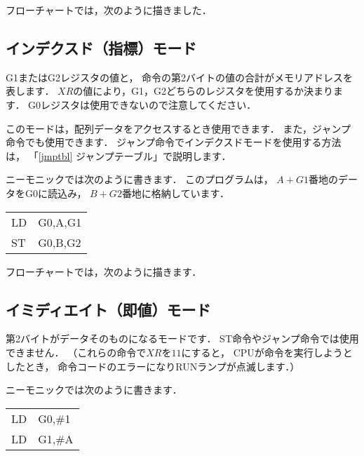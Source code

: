 フローチャートでは，次のように描きました．

\begin{center}
\end{center}

\subsection{インデクスド（指標）モード}
G1またはG2レジスタの値と，
命令の第2バイトの値の合計がメモリアドレスを表します．
$XR$の値により，G1，G2どちらのレジスタを使用するか決まります．
G0レジスタは使用できないので注意してください．

このモードは，配列データをアクセスするとき使用できます．
また，ジャンプ命令でも使用できます．
ジャンプ命令でインデクスドモードを使用する方法は，
「\ref{jmptbl} ジャンプテーブル」で説明します．

ニーモニックでは次のように書きます．
このプログラムは，
$A+G1$番地のデータをG0に読込み，
$B+G2$番地に格納しています．

{\ttfamily\begin{center}
  \begin{tabular}{l l}
    LD & G0,A,G1 \\
    ST & G0,B,G2 \\
  \end{tabular}
\end{center}}

フローチャートでは，次のように描きます．

\begin{center}
\end{center}

\subsection{イミディエイト（即値）モード}
第2バイトがデータそのものになるモードです．
ST命令やジャンプ命令では使用できません．
（これらの命令で$XR$を$11$にすると，
  CPUが命令を実行しようとしたとき，
  命令コードのエラーになりRUNランプが点滅します．）

ニーモニックでは次のように書きます．
{\ttfamily\begin{center}
  \begin{tabular}{l l}
    LD & G0,\#1       \\
    LD & G1,\#A       \\
  \end{tabular}
\end{center}}

